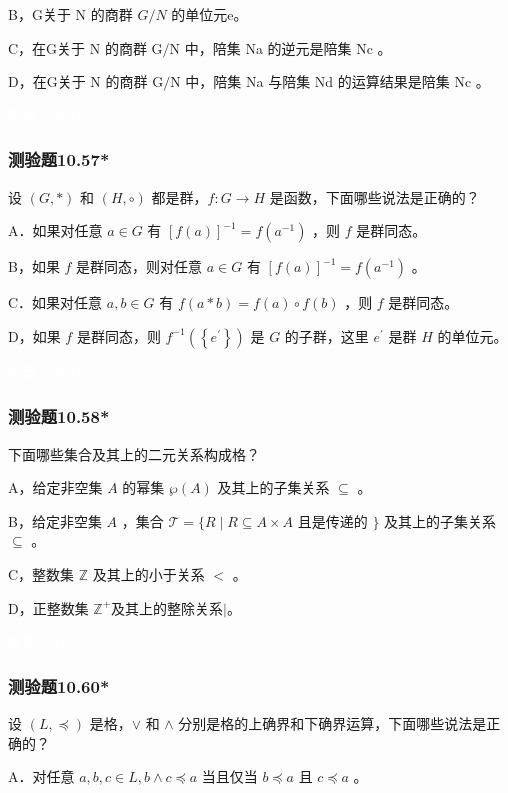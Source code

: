 \documentclass[UTF8, heading=true]{ctexart}
\begin{document}
B，G关于 N 的商群 $G / N$ 的单位元e。

C，在G关于 N 的商群 $\mathrm{G} / \mathrm{N}$ 中，陪集 Na 的逆元是陪集 Nc 。

D，在G关于 N 的商群 $\mathrm{G} / \mathrm{N}$ 中，陪集 Na 与陪集 Nd 的运算结果是陪集 Nc 。

\textcolor{white}{答案：ACD}


\subsubsection{测验题10.57*}

设 $(G, *)$ 和 $(H, \circ)$ 都是群，$f: G \rightarrow H$ 是函数，下面哪些说法是正确的？

A．如果对任意 $a \in G$ 有 $[f(a)]^{-1}=f\left(a^{-1}\right)$ ，则 $f$ 是群同态。

B，如果 $f$ 是群同态，则对任意 $a \in G$ 有 $[f(a)]^{-1}=f\left(a^{-1}\right)$ 。

C．如果对任意 $a, b \in G$ 有 $f(a * b)=f(a) \circ f(b)$ ，则 $f$ 是群同态。

D，如果 $f$ 是群同态，则 $f^{-1}\left(\left\{e^{\prime}\right\}\right)$ 是 $G$ 的子群，这里 $e^{\prime}$ 是群 $H$ 的单位元。

\textcolor{white}{答案：BCD}

\subsubsection{测验题10.58*}

下面哪些集合及其上的二元关系构成格？

A，给定非空集 $A$ 的幂集 $\wp(A)$ 及其上的子集关系 $\subseteq$ 。

B，给定非空集 $A$ ，集合 $\mathcal{T}=\{R \mid R \subseteq A \times A$ 且是传递的 $\}$ 及其上的子集关系 $\subseteq$ 。

C，整数集 $\mathbb{Z}$ 及其上的小于关系 $<$ 。

D，正整数集 $\mathbb{Z}^{+}$及其上的整除关系$\mid$。

\textcolor{white}{答案：AD}

\subsubsection{测验题10.60*}

设 $(L, \preceq)$ 是格，$\vee$ 和 $\wedge$ 分别是格的上确界和下确界运算，下面哪些说法是正确的？

A．对任意 $a, b, c \in L,  b \wedge c \preceq a$ 当且仅当 $b \preceq a$ 且 $c \preceq a$ 。
\end{document}
